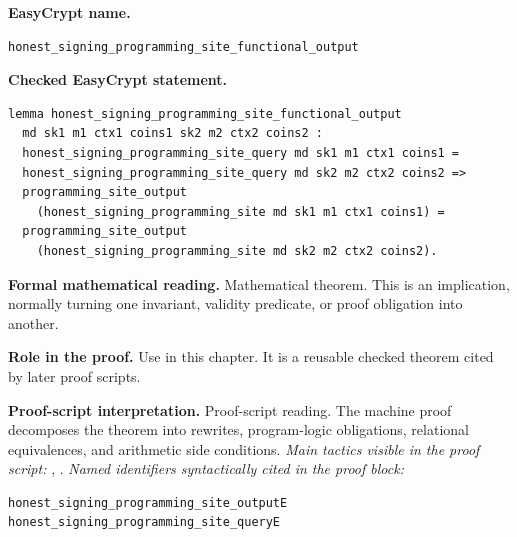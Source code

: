 \begin{formaltheorem}
\noindent\textbf{EasyCrypt name.}
\begin{lstlisting}[language=EasyCrypt,basicstyle=\ttfamily\scriptsize]
honest_signing_programming_site_functional_output
\end{lstlisting}
\noindent\textbf{Checked EasyCrypt statement.}
\begin{lstlisting}[language=EasyCrypt,basicstyle=\ttfamily\scriptsize]
lemma honest_signing_programming_site_functional_output
  md sk1 m1 ctx1 coins1 sk2 m2 ctx2 coins2 :
  honest_signing_programming_site_query md sk1 m1 ctx1 coins1 =
  honest_signing_programming_site_query md sk2 m2 ctx2 coins2 =>
  programming_site_output
    (honest_signing_programming_site md sk1 m1 ctx1 coins1) =
  programming_site_output
    (honest_signing_programming_site md sk2 m2 ctx2 coins2).
\end{lstlisting}
\noindent\textbf{Formal mathematical reading.}
Mathematical theorem. This is an implication, normally turning one invariant, validity predicate, or proof obligation into another.

\noindent\textbf{Role in the proof.}
Use in this chapter. It is a reusable checked theorem cited by later proof scripts.

\noindent\textbf{Proof-script interpretation.}
Proof-script reading. The machine proof decomposes the theorem into rewrites, program-logic obligations, relational equivalences, and arithmetic side conditions.
\emph{Main tactics visible in the proof script:} , .
\emph{Named identifiers syntactically cited in the proof block:}
\begin{lstlisting}[language=EasyCrypt,basicstyle=\ttfamily\scriptsize]
honest_signing_programming_site_outputE
honest_signing_programming_site_queryE
\end{lstlisting}

\end{formaltheorem}

